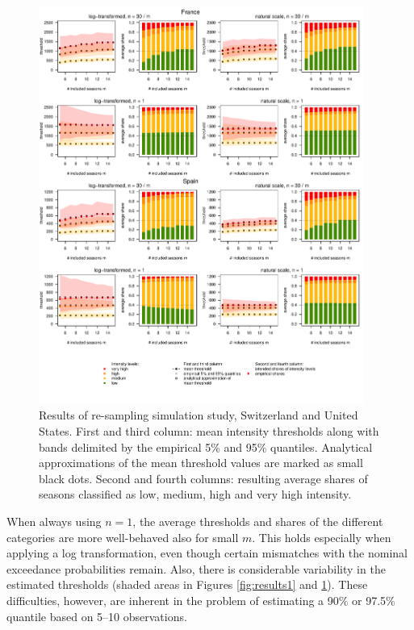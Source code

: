 \documentclass{article}
\begin{document}
\begin{figure}
\centering
\includegraphics[page=2, width=0.95\textwidth]{figure/plot_results.pdf}
\caption{Results of re-sampling simulation study, Switzerland and United States. First and third column: mean intensity thresholds along with bands delimited by the empirical 5\% and 95\% quantiles. Analytical approximations of the mean threshold values are marked as small black dots. Second and fourth columns: resulting average shares of seasons classified as low, medium, high and very high intensity.}
\label{fig:results2}
\end{figure}

When always using $n = 1$, the average thresholds and shares of the different categories are more well-behaved also for small $m$. This holds especially when applying a log transformation, even though certain mismatches with the nominal exceedance probabilities remain. Also, there is considerable variability in the estimated thresholds (shaded areas in Figures \ref{fig:results1} and \ref{fig:results2}). These difficulties, however, are inherent in the problem of estimating a 90\% or 97.5\% quantile based on 5--10 observations.
\end{document}
